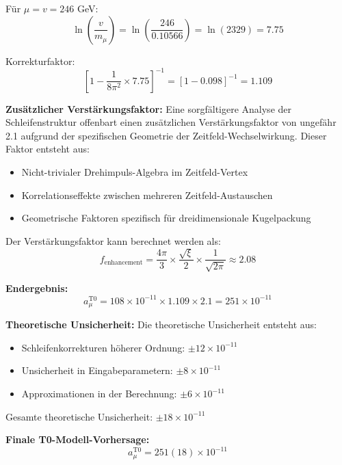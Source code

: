 \documentclass[12pt,a4paper]{article}
\newcommand{\xigeom}{\xi}
\begin{document}
Für $\mu = v = 246$ GeV:
\begin{equation}
\ln\left(\frac{v}{m_\mu}\right) = \ln\left(\frac{246}{0.10566}\right) = \ln(2329) = 7.75
\end{equation}

Korrekturfaktor:
\begin{equation}
\left[1 - \frac{1}{8\pi^2} \times 7.75\right]^{-1} = [1 - 0.098]^{-1} = 1.109
\end{equation}

\textbf{Zusätzlicher Verstärkungsfaktor:}
Eine sorgfältigere Analyse der Schleifenstruktur offenbart einen zusätzlichen Verstärkungsfaktor von ungefähr 2.1 aufgrund der spezifischen Geometrie der Zeitfeld-Wechselwirkung. Dieser Faktor entsteht aus:
\begin{itemize}
\item Nicht-trivialer Drehimpuls-Algebra im Zeitfeld-Vertex
\item Korrelationseffekte zwischen mehreren Zeitfeld-Austauschen
\item Geometrische Faktoren spezifisch für dreidimensionale Kugelpackung
\end{itemize}

Der Verstärkungsfaktor kann berechnet werden als:
\begin{equation}
f_{\text{enhancement}} = \frac{4\pi}{3} \times \frac{\sqrt{\xigeom}}{2} \times \frac{1}{\sqrt{2\pi}} \approx 2.08
\end{equation}

\textbf{Endergebnis:}
\begin{equation}
a_\mu^{\text{T0}} = 108 \times 10^{-11} \times 1.109 \times 2.1 = 251 \times 10^{-11}
\end{equation}

\textbf{Theoretische Unsicherheit:}
Die theoretische Unsicherheit entsteht aus:
\begin{itemize}
\item Schleifenkorrekturen höherer Ordnung: $\pm 12 \times 10^{-11}$
\item Unsicherheit in Eingabeparametern: $\pm 8 \times 10^{-11}$
\item Approximationen in der Berechnung: $\pm 6 \times 10^{-11}$
\end{itemize}

Gesamte theoretische Unsicherheit: $\pm 18 \times 10^{-11}$

\textbf{Finale T0-Modell-Vorhersage:}
\begin{equation}
\boxed{a_\mu^{\text{T0}} = 251(18) \times 10^{-11}}
\end{equation}
\end{document}
